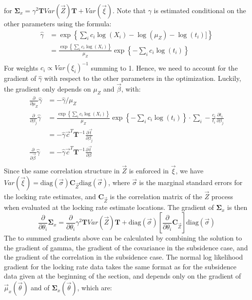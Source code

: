 {for $\mathbf{\Sigma}_x = \gamma^2 \mathbf{T} Var\left(\vec{Z}\right) \mathbf{T} + Var(\vec{\xi})$.  Note that $\gamma$ is estimated conditional on the other parameters using the formula:
\begin{align*}
\hat{\gamma} &= \exp \left\{ \sum_i c_i \log(X_i) - \log(\mu_Z) - \log(t_i)]\right\} \\
&= \frac{\exp \left\{ \sum_i c_i \log(X_i) \right\}}{\mu_Z} \exp \left\{- \sum_i c_i \log(t_i) \right\} \\
\end{align*}
For weights $c_i \propto Var(\xi_i)^{-1}$ summing to 1. Hence, we need to account for the gradient of $\hat{\gamma}$ with respect to the other parameters in the optimization.  Luckily, the gradient only depends on $\mu_Z$ and $\vec{\beta}$, with:
\begin{align*}
\frac{\partial}{\partial \mu_Z} \hat{\gamma} &= - \hat{\gamma}/\mu_Z \\
\frac{\partial}{\partial \beta_j} \hat{\gamma} &= \frac{\exp \left\{ \sum_i c_i \log(X_i) \right\}}{\mu_Z} \exp \left\{- \sum_i c_i \log(t_i) \right\} \cdot \sum_i-\frac{c_i}{t_i} \frac{\partial t_i}{\partial \beta_j} \\
&= -\hat{\gamma} \vec{c}^T \mathbf{T}^{-1} \frac{\partial \vec{t}}{\partial \beta_j} \\
\frac{\partial}{\partial \vec{\beta}} \hat{\gamma} &= -\hat{\gamma} \vec{c}^T \mathbf{T}^{-1} \frac{\partial \vec{t}}{\partial \beta} \\
\end{align*}
Since the same correlation structure in $\vec{Z}$ is enforced in $\vec{\xi }$, we have $Var(\vec{\xi }) = \text{diag}(\vec{\sigma }) \mathbf{C}_{\vec{Z}} \text{diag}(\vec{\sigma }) $, where $\vec{\sigma }$ is the marginal standard errors for the locking rate estimates, and $\mathbf{C}_{\vec{Z}}$ is the correlation matrix of the $\vec{Z}$ process when evaluated at the locking rate estimate locations. The gradient of $\mathbf{\Sigma}_x$ is then
$$ \frac{\partial}{\partial \theta_i} \mathbf{\Sigma}_x = \frac{\partial}{\partial \theta_i} \gamma^2 \mathbf{T} Var\left(\vec{Z}\right) \mathbf{T} + \text{diag}(\vec{\sigma })\left  [\frac{\partial}{\partial \theta_i} \mathbf{C}_{\vec{Z}}\right ] \text{diag}(\vec{\sigma }) $$
The to summed gradients above can be calculated by combining the solution to the gradient of gamma, the gradient of the covariance in the subsidence case, and the gradient of the correlation in the subsidence case. The normal log likelihood gradient for the locking rate data takes the same format as for the subsidence data given at the beginning of the section, and depends only on the gradient of $\vec{\mu}_x(\vec{\theta})$ and of $\mathbf{\Sigma}_x(\vec{\theta})$, which are:

}
